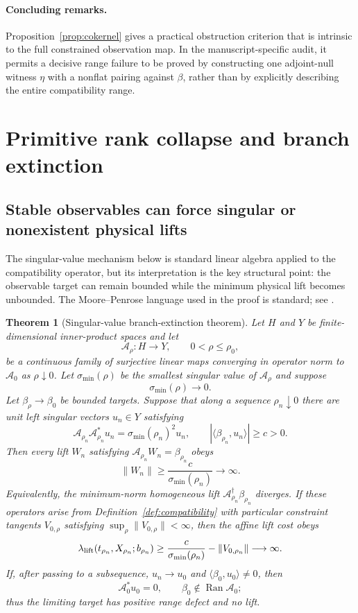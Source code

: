 \documentclass[12pt]{article}
\newtheorem{theorem}{Theorem}[section]
\newcommand{\Ran}{\operatorname{Ran}}
\newcommand{\Comp}{\mathscr A}
\begin{document}
\paragraph{Concluding remarks.}
Proposition~\ref{prop:cokernel} gives a practical obstruction criterion that is intrinsic to the full constrained observation map. In the manuscript-specific audit, it permits a decisive range failure to be proved by constructing one adjoint-null witness $\eta$ with a nonflat pairing against $\beta$, rather than by explicitly describing the entire compatibility range.

\section{Primitive rank collapse and branch extinction}
\subsection{Stable observables can force singular or nonexistent physical lifts}
The singular-value mechanism below is standard linear algebra applied to the compatibility operator, but its interpretation is the key structural point: the observable target can remain bounded while the minimum physical lift becomes unbounded. The Moore--Penrose language used in the proof is standard; see \cite{BenIsraelGreville}.

\begin{theorem}[Singular-value branch-extinction theorem]\label{thm:rankcollapse}
Let $H$ and $Y$ be finite-dimensional inner-product spaces and let
\[
\Comp_\rho:H\to Y,
\qquad 0<\rho\le\rho_0,
\]
be a continuous family of surjective linear maps converging in operator norm to $\Comp_0$ as $\rho\downarrow0$. Let $\sigma_{\min}(\rho)$ be the smallest singular value of $\Comp_\rho$ and suppose
\[
\sigma_{\min}(\rho)\to0.
\]
Let $\beta_\rho\to\beta_0$ be bounded targets. Suppose that along a sequence $\rho_n\downarrow0$ there are unit left singular vectors $u_n\in Y$ satisfying
\[
\Comp_{\rho_n}\Comp_{\rho_n}^*u_n
=\sigma_{\min}(\rho_n)^2u_n,
\qquad
|\langle\beta_{\rho_n},u_n\rangle|\ge c>0.
\]
Then every lift $W_n$ satisfying $\Comp_{\rho_n}W_n=\beta_{\rho_n}$ obeys
\[
\|W_n\|\ge \frac{c}{\sigma_{\min}(\rho_n)}\to\infty.
\]
Equivalently, the minimum-norm homogeneous lift $\Comp_{\rho_n}^\dagger\beta_{\rho_n}$ diverges. If these operators arise from Definition~\ref{def:compatibility} with particular constraint tangents $V_{0,\rho}$ satisfying $\sup_\rho\|V_{0,\rho}\|<\infty$, then the affine lift cost obeys
\[
\lambda_{\rm lift}(t_{\rho_n},X_{\rho_n};b_{\rho_n})
\ge \frac{c}{\sigma_{\min}(\rho_n)}-\|V_{0,\rho_n}\|
\longrightarrow\infty.
\]
If, after passing to a subsequence, $u_n\to u_0$ and $\langle\beta_0,u_0\rangle\neq0$, then
\[
\Comp_0^*u_0=0,
\qquad
\beta_0\notin\Ran\Comp_0;
\]
thus the limiting target has positive range defect and no lift.
\end{theorem}
\end{document}

